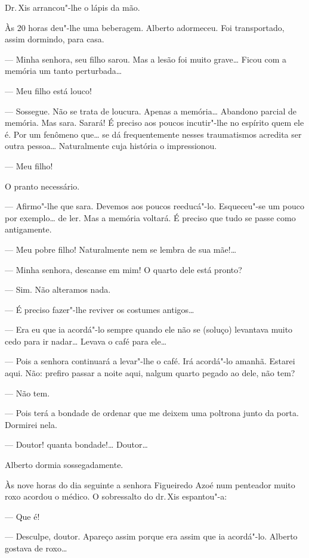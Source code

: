 Dr.\,Xis arrancou"-lhe o lápis da mão.

Às 20 horas deu"-lhe uma beberagem. Alberto adormeceu. Foi transportado,
assim dormindo, para casa.

--- Minha senhora, seu filho sarou. Mas a lesão foi muito grave\ldots{} Ficou
com a memória um tanto perturbada\ldots{}

--- Meu filho está louco!

--- Sossegue. Não se trata de loucura. Apenas a memória\ldots{} Abandono
parcial de memória. Mas sara. Sarará! É preciso aos poucos incutir"-lhe
no espírito quem ele é. Por um fenômeno que\ldots{} se dá frequentemente
nesses traumatismos acredita ser outra pessoa\ldots{} Naturalmente cuja
história o impressionou.

--- Meu filho!

O pranto necessário.

--- Afirmo"-lhe que sara. Devemos aos poucos reeducá"-lo. Esqueceu"-se um
pouco por exemplo\ldots{} de ler. Mas a memória voltará. É preciso que tudo
se passe como antigamente.

--- Meu pobre filho! Naturalmente nem se lembra de sua mãe!\ldots{}

--- Minha senhora, descanse em mim! O quarto dele está pronto?

--- Sim. Não alteramos nada.

--- É preciso fazer"-lhe reviver os costumes antigos\ldots{}

--- Era eu que ia acordá"-lo sempre quando ele não se (soluço) levantava
muito cedo para ir nadar\ldots{} Levava o café para ele\ldots{}

--- Pois a senhora continuará a levar"-lhe o café. Irá acordá"-lo amanhã.
Estarei aqui. Não: prefiro passar a noite aqui, nalgum quarto pegado ao
dele, não tem?

--- Não tem.

--- Pois terá a bondade de ordenar que me deixem uma poltrona junto da
porta. Dormirei nela.

--- Doutor! quanta bondade!\ldots{} Doutor\ldots{}

Alberto dormia sossegadamente.

Às nove horas do dia seguinte a senhora Figueiredo Azoé num penteador
muito roxo acordou o médico. O sobressalto do dr.\,Xis espantou"-a:

--- Que é!

--- Desculpe, doutor. Apareço assim porque era assim que ia acordá"-lo.
Alberto gostava de roxo\ldots{}

